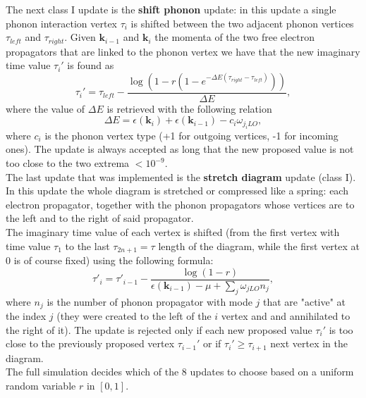 The next class I update is the \textbf{shift phonon} update: in this update a single phonon interaction vertex $\tau_i$ is shifted between 
the two adjacent phonon vertices $\tau_{left}$ and $\tau_{right}$. Given $\mathbf{k}_{i-1}$ and $\mathbf{k}_i$ the momenta of the two free electron propagators 
that are linked to the phonon vertex we have that the new imaginary time value $\tau_i'$ is found as
\begin{equation}
    \tau_i'=\tau_{left}-\frac{\log{(1-r(1-e^{-\Delta E(\tau_{right}-\tau_{left})}))}}{\Delta E},
\end{equation}
where the value of $\Delta E$ is retrieved with the following relation
\begin{equation}
    \Delta E =\epsilon(\mathbf{k}_{i})+\epsilon(\mathbf{k}_{i-1})-c_i\omega_{j_iLO},
\end{equation}
where $c_i$ is the phonon vertex type (+1 for outgoing vertices, -1 for incoming ones). The update is always accepted as long that the new proposed value 
is not too close to the two extrema $<10^{-9}$.\\
The last update that was implemented is the \textbf{stretch diagram} update (class I). In this update the whole diagram is stretched or compressed
like a spring: each electron propagator, together with the phonon propagators whose vertices are to the left and to the right of said propagator.\\
The imaginary time value of each vertex is shifted (from the first vertex with time value $\tau_1$ to the last $\tau_{2n+1}=\tau$ length of the diagram, while the first vertex at 0 is of course fixed) 
using the following formula:
\begin{equation}
    \tau'_i=\tau'_{i-1}-\frac{\log{(1-r)}}{\epsilon(\mathbf{k}_{i-1})-\mu+\sum_j\omega_{jLO}n_j},
\end{equation}
where $n_j$ is the number of phonon propagator with mode $j$ that are "active" at the index $j$ (they were created to the left of the 
$i$ vertex and and annihilated to the right of it). The update is rejected only if each new proposed value $\tau_i'$ is too close to the previously proposed 
vertex $\tau_{i-1}'$ or if $\tau_i'\ge\tau_{i+1}$ next vertex in the diagram.\\
The full simulation decides which of the 8 updates to choose based on a uniform random variable $r$ in $[0,1]$.
